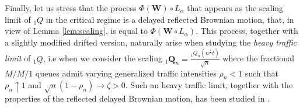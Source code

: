\documentclass[]{amsart}
\numberwithin{equation}{section}
\theoremstyle{remark}
\theoremstyle{definition}
\begin{document}
Finally, let us stress that the process $\Phi(\mathbf{W})\circ L_\alpha$ that appears as the scaling limit of ${}_1Q$ in the critical regime is a delayed reflected Brownian motion, that, in view of Lemma \ref{lem:scaling}, is equal to $\Phi(\mathbf{W}\circ L_\alpha)$. This process, together with a slightly modified drifted version, naturally arise when studying the \textit{heavy traffic limit} of ${}_1Q$, i.e when we consider the scaling ${}_1\mathbf{Q}_n=\frac{{}_1Q_n(n^{\frac{1}{\alpha}}t)}{\sqrt{n}}$ where the fractional $M/M/1$ queues admit varying generalized traffic intensities $\rho_n<1$ such that $\rho_n \uparrow 1$ and $\sqrt{n}(1-\rho_n) \to \zeta>0$. Such an heavy traffic limit, together with the properties of the reflected delayed Brownian motion, has been studied in \cite{ascione2022skorokhod}.
\end{document}

